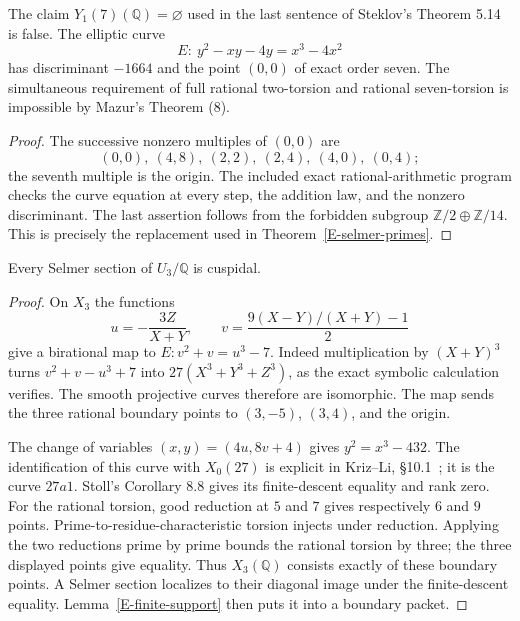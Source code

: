 \begin{proposition}
\label{E-seven-error}
The claim $Y_1(7)(\mathbb Q)=\varnothing$ used in the
last sentence of Steklov's Theorem 5.14 is false.
The elliptic curve
\[
 E:\ y^2-xy-4y=x^3-4x^2
\]
has discriminant $-1664$ and the point $(0,0)$
of exact order seven. The simultaneous requirement
of full rational two-torsion and rational
seven-torsion is impossible by Mazur's Theorem (8).
\end{proposition}
\begin{proof}
The successive nonzero multiples of $(0,0)$ are
\[
 (0,0),\ (4,8),\ (2,2),\ (2,4),\ (4,0),\ (0,4);
\]
the seventh multiple is the origin.
The included exact rational-arithmetic program
checks the curve equation at every step, the
addition law, and the nonzero discriminant.
The last assertion follows from the forbidden
subgroup $\mathbb Z/2\oplus\mathbb Z/14$.
This is precisely the replacement used in
Theorem~\ref{E-selmer-primes}.
\end{proof}

\begin{theorem}
\label{E-selmer-three}
Every Selmer section of $U_3/\mathbb Q$ is cuspidal.
\end{theorem}
\begin{proof}
On $X_3$ the functions
\[
 u=-\frac{3Z}{X+Y},\qquad
 v=\frac{9(X-Y)/(X+Y)-1}{2}
\]
give a birational map to $E:v^2+v=u^3-7$.
Indeed multiplication by $(X+Y)^3$ turns
$v^2+v-u^3+7$ into
$27(X^3+Y^3+Z^3)$, as the exact symbolic
calculation verifies. The smooth projective
curves therefore are isomorphic. The map sends
the three rational boundary points to
$(3,-5)$, $(3,4)$, and the origin.

The change of variables
$(x,y)=(4u,8v+4)$ gives $y^2=x^3-432$.
The identification of this curve with $X_0(27)$
is explicit in Kriz--Li, \S10.1~\cite{KrizLi2019};
it is the curve $27a1$. Stoll's Corollary 8.8
gives its finite-descent equality and rank zero.
For the rational torsion, good reduction at
$5$ and $7$ gives respectively $6$ and $9$
points. Prime-to-residue-characteristic
torsion injects under reduction. Applying
the two reductions prime by prime bounds
the rational torsion by three; the three
displayed points give equality. Thus
$X_3(\mathbb Q)$ consists exactly of these
boundary points. A Selmer section localizes
to their diagonal image under the
finite-descent equality. Lemma~\ref{E-finite-support}
then puts it into a boundary packet.
\end{proof}

